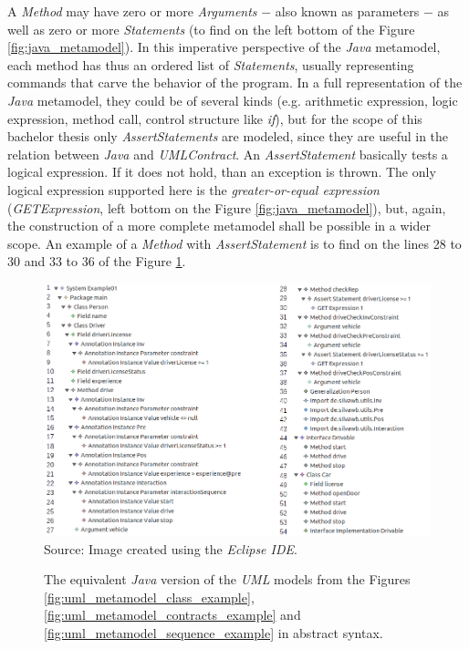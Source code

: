\documentclass[tuberlin,cic,tc,english,noabntcite, oneside]{iiufrgs}
\begin{document}
A \emph{Method} may have zero or more \emph{Arguments} $-$ also known as parameters $-$ as well as zero or more \emph{Statements} (to find on the left bottom of the Figure \ref{fig:java_metamodel}). In this imperative perspective of the \emph{Java} metamodel, each method has thus an ordered list of \emph{Statements}, usually representing commands that carve the behavior of the program. In a full representation of the \emph{Java} metamodel, they could be of several kinds (e.g. arithmetic expression, logic expression, method call, control structure like \emph{if}), but for the scope of this bachelor thesis only \emph{AssertStatements} are modeled, since they are useful in the relation between \emph{Java} and \emph{UMLContract}. An \emph{AssertStatement} basically tests a logical expression. If it does not hold, than an exception is thrown. The only logical expression supported here is the \emph{greater-or-equal expression} (\emph{GETExpression}, left bottom on the Figure \ref{fig:java_metamodel}), but, again, the construction of a more complete metamodel shall be possible in a wider scope. An example of a \emph{Method} with \emph{AssertStatement} is to find on the lines 28 to 30 and 33 to 36 of the Figure \ref{fig:java_metamodel_example}.

\begin{figure}[H]
	\centering
    \caption{The equivalent \emph{Java} version of the \emph{UML} models from the Figures \ref{fig:uml_metamodel_class_example},  \ref{fig:uml_metamodel_contracts_example} and \ref{fig:uml_metamodel_sequence_example} in abstract syntax.}
    \includegraphics[width=\textwidth]{javaMetamodelExample01} \\
    Source: Image created using the \emph{Eclipse IDE}.
    \label{fig:java_metamodel_example}
\end{figure}
\end{document}

